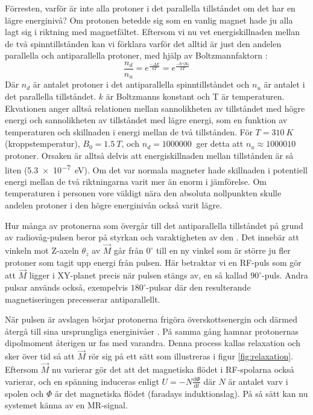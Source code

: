 \documentclass[11pt, a4paper]{article}
\begin{document}
Förresten, varför är inte alla protoner i det parallella tillståndet om det har en lägre energinivå? Om protonen betedde sig som en vanlig magnet hade ju alla lagt sig i riktning med magnetfältet. Eftersom vi nu vet energiskillnaden mellan de två spinntillstånden kan vi förklara varför det alltid är just den andelen parallella och antiparallella protoner, med hjälp av Boltzmannfaktorn \parencite[s. 90]{mri_lärobok}:
\begin{equation}
	\frac{n_d}{n_u}=e^\frac{-\Delta E}{kT}=e^\frac{-\hbar\gamma B_0}{kT}
\end{equation}
Där $n_d$ är antalet protoner i det antiparallella spinntillståndet och $n_u$ är antalet i det parallella tillståndet. $k$ är Boltzmanns konstant och T är temperaturen. Ekvationen anger alltså relationen mellan sannolikheten av tillståndet med högre energi och sannolikheten av tillståndet med lägre energi, som en funktion av temperaturen och skillnaden i energi mellan de två tillstånden. För $T=\SI{310}{K}$ (kroppstemperatur), $B_0=\SI{1.5}{T}$, och $n_d=\SI{1000000}{}$ ger detta att $n_u\approx\SI{1000010}{}$ protoner. Orsaken är alltså delvis att energiskillnaden mellan tillstånden är så liten (\SI{5.3e-7}{eV}). Om det var normala magneter hade skillnaden i potentiell energi mellan de två riktningarna varit mer än enorm i jämförelse. Om temperaturen i personen vore väldigt nära den absoluta nollpunkten skulle andelen protoner i den högre energinivån också varit lägre.

Hur många av protonerna som övergår till det antiparallella tillståndet på grund av radiovåg-pulsen beror på styrkan och varaktigheten av den \parencite{mri_for_radiologists}. Det innebär att vinkeln mot Z-axeln $\theta_z$ av $\vec{M}$ går från $0^\circ$ till en ny vinkel som är större ju fler protoner som tagit upp energi från pulsen. Här betraktar vi en RF-puls som gör att $\vec{M}$ ligger i XY-planet precis när pulsen stängs av, en så kallad $90^\circ$-puls. Andra pulsar används också, exempelvis $180^\circ$-pulsar där den resulterande magnetiseringen precesserar antiparallellt.

När pulsen är avslagen börjar protonerna frigöra överskottsenergin och därmed återgå till sina ursprungliga energinivåer \parencite{understanding_mri}. På samma gång hamnar protonernas dipolmoment återigen ur fas med varandra. Denna process kallas relaxation och sker över tid så att $\vec{M}$ rör sig på ett sätt som illustreras i figur \ref{fig:relaxation}. Eftersom $\vec{M}$ nu varierar gör det att det magnetiska flödet i RF-spolarna också varierar, och en spänning induceras enligt $U=-N\frac{\mathrm{d}\Phi}{\mathrm{d}t}$ där $N$ är antalet varv i spolen och $\Phi$ är det magnetiska flödet (faradays induktionslag). På så sätt kan nu systemet känna av en MR-signal.
\end{document}
